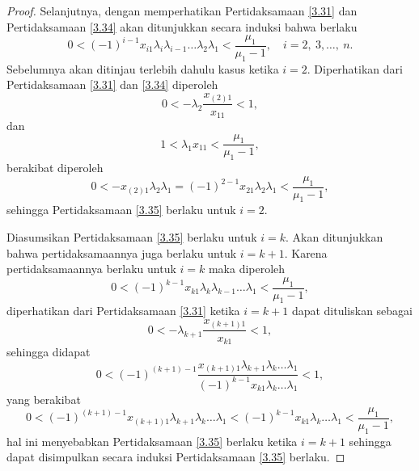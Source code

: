 \begin{proof}
    Selanjutnya, dengan memperhatikan Pertidaksamaan \eqref{3.31} dan Pertidaksamaan \eqref{3.34} akan ditunjukkan secara induksi bahwa berlaku
    \begin{equation}\label{3.35}
        0 < (-1)^{i-1}x_{i1}\lambda_i\lambda_{i-1}\dots\lambda_2\lambda_1 < \frac{\mu_1}{\mu_1 - 1}, \quad i=2,~3,\dots,~n.
    \end{equation}
    Sebelumnya akan ditinjau terlebih dahulu kasus ketika $i=2$. Diperhatikan dari Pertidaksamaan \eqref{3.31} dan \eqref{3.34} diperoleh
    \begin{equation*}
        0 < -\lambda_{2}\frac{x_{(2)1}}{x_{11}} < 1,
    \end{equation*}
    dan
    \begin{equation*}
        1 < \lambda_{1}x_{11} <  \frac{\mu_1}{\mu_1 - 1},
    \end{equation*}
    berakibat diperoleh
    \begin{equation*}
        0 < -x_{(2)1}\lambda_{2}\lambda_1 = (-1)^{2-1}x_{21}\lambda_{2}\lambda_1 < \frac{\mu_1}{\mu_1 - 1},
    \end{equation*}
    sehingga Pertidaksamaan \eqref{3.35} berlaku untuk $i=2$.

    Diasumsikan Pertidaksamaan \eqref{3.35} berlaku untuk $i=k$. Akan ditunjukkan bahwa pertidaksamaannya juga berlaku untuk $i=k+1$. Karena pertidaksamaannya berlaku untuk $i=k$ maka diperoleh
    \begin{equation*}
        0 < (-1)^{k-1}x_{k1}\lambda_k\lambda_{k-1}\dots\lambda_1 < \frac{\mu_1}{\mu_1 - 1},
    \end{equation*}
    diperhatikan dari Pertidaksamaan \eqref{3.31} ketika $i=k+1$ dapat dituliskan sebagai
    \begin{equation*}
        0 < - \lambda_{k+1} \frac{x_{(k+1)1}}{x_{k1}} < 1,
    \end{equation*}
    sehingga didapat
    \begin{equation*}
        0 < (-1)^{(k+1)-1} \frac{x_{(k+1)1}\lambda_{k+1}\lambda_k \dots \lambda_1 }{(-1)^{k-1} x_{k1} \lambda_k \dots \lambda_1 } < 1,
    \end{equation*}
    yang berakibat
    \begin{equation*}
        0 < (-1)^{(k+1)-1} x_{(k+1)1}\lambda_{k+1}\lambda_k \dots \lambda_1  < (-1)^{k-1} x_{k1} \lambda_k \dots \lambda_1  < \frac{\mu_1}{\mu_1 - 1},
    \end{equation*}
    hal ini menyebabkan Pertidaksamaan \eqref{3.35} berlaku ketika $i=k+1$ sehingga dapat disimpulkan secara induksi Pertidaksamaan \eqref{3.35} berlaku.


\end{proof}
